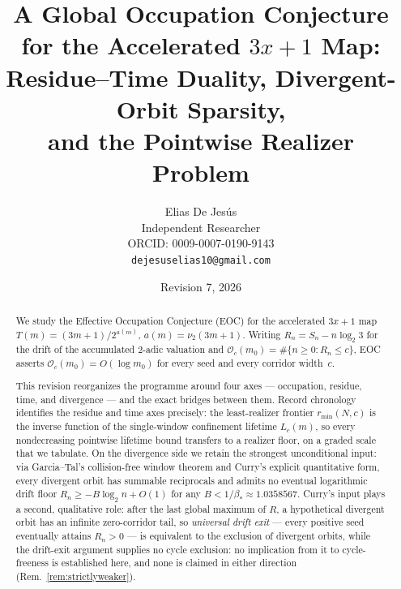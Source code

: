 \documentclass[11pt]{article}
\title{A Global Occupation Conjecture for the Accelerated $3x+1$ Map:\\
Residue--Time Duality, Divergent-Orbit Sparsity,\\ and the Pointwise Realizer Problem}
\author{Elias De Jes\'us\\ Independent Researcher\\ ORCID: 0009-0007-0190-9143\\ \texttt{dejesuselias10@gmail.com}}
\date{Revision 7, 2026}
\theoremstyle{plain}
\theoremstyle{definition}
\theoremstyle{remark}
\newcommand{\Occ}{\mathcal{O}}
\newcommand{\rmin}{r_{\min}}
\begin{document}
\maketitle

\begin{abstract}
We study the Effective Occupation Conjecture (EOC) for the accelerated $3x+1$ map
$T(m)=(3m+1)/2^{a(m)}$, $a(m)=\nu_2(3m+1)$. Writing $R_n=S_n-n\log_2 3$ for the drift of the
accumulated $2$-adic valuation and $\Occ_c(m_0)=\#\{n\ge 0: R_n\le c\}$, EOC asserts
$\Occ_c(m_0)=O(\log m_0)$ for every seed and every corridor width~$c$.

This revision reorganizes the programme around four axes --- occupation, residue, time, and
divergence --- and the exact bridges between them. Record chronology identifies the residue and
time axes precisely: the least-realizer frontier $\rmin(N,c)$ is the inverse function of the
single-window confinement lifetime $L_c(m)$, so every nondecreasing pointwise lifetime bound
transfers to a
realizer floor, on a graded scale that we tabulate. On the divergence side we retain the strongest
unconditional input: via Garcia--Tal's collision-free window theorem and Curry's explicit
quantitative form, every divergent orbit has summable reciprocals and admits no eventual
logarithmic drift floor $R_n\ge -B\log_2 n+O(1)$ for any $B<1/\beta_*\approx 1.0358567$. Curry's
input plays a second, qualitative role: after the last global maximum of $R$, a hypothetical
divergent orbit has an infinite zero-corridor tail, so \emph{universal drift exit} --- every
positive seed eventually attains $R_n>0$ --- is equivalent to the exclusion of divergent orbits,
while the drift-exit argument supplies no cycle exclusion: no implication from it to cycle-freeness
is established here, and none is claimed in either direction
(Rem.~\ref{rem:strictlyweaker}).


\end{abstract}
\end{document}
